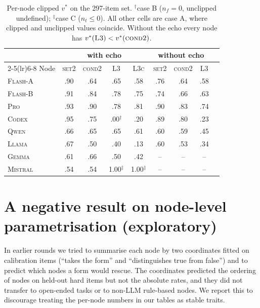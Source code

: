 \documentclass[11pt]{article}
\begin{document}
\begin{table}[h]
\centering\scriptsize
\setlength{\tabcolsep}{3.5pt}
\begin{tabular}{@{}lcccccccc@{}}
\toprule
& \multicolumn{4}{c}{with echo} & \multicolumn{3}{c}{without echo} \\
\cmidrule(lr){2-5}\cmidrule(lr){6-8}
Node & \textsc{set2} & \textsc{cond2} & \textsc{L3} & \textsc{L3c} & \textsc{set2} & \textsc{cond2} & \textsc{L3} \\
\midrule
\textsc{Flash-A} & .90 & .64 & .65 & .58 & .76 & .64 & .58 \\
\textsc{Flash-B} & .91 & .84 & .78 & .75 & .74 & .66 & .63 \\
\textsc{Pro} & .93 & .90 & .78 & .81 & .90 & .83 & .74 \\
\textsc{Codex} & .95 & .75 & .00$^\dagger$ & .20 & .89 & .80 & .23 \\
\textsc{Qwen} & .66 & .65 & .65 & .61 & .60 & .59 & .45 \\
\textsc{Llama} & .67 & .50 & .40 & .13 & .60 & .53 & .34 \\
\midrule
\textsc{Gemma} & .61 & .66 & .50 & .42 & -- & -- & -- \\
\textsc{Mistral} & .54 & .54 & 1.00$^\ddagger$ & 1.00$^\ddagger$ & -- & -- & -- \\
\bottomrule
\end{tabular}
\caption{Per-node clipped $v^\ast$ on the 297-item set. $^\dagger$case B ($n_f=0$, unclipped undefined); $^\ddagger$case C ($n_t\le0$). All other cells are case A, where clipped and unclipped values coincide. Without the echo every node has $v^\ast(\textsc{L3})<v^\ast(\textsc{cond2})$.}
\label{tab:pernodev}
\end{table}

\section{A negative result on node-level parametrisation (exploratory)}
\label{app:negative}

In earlier rounds we tried to summarise each node by two coordinates fitted on calibration items (``takes the form'' and ``distinguishes true from false'') and to predict which nodes a form would rescue. The coordinates predicted the ordering of nodes on held-out hard items but not the absolute rates, and they did not transfer to open-ended tasks or to non-LLM rule-based nodes. We report this to discourage treating the per-node numbers in our tables as stable traits.
\end{document}
